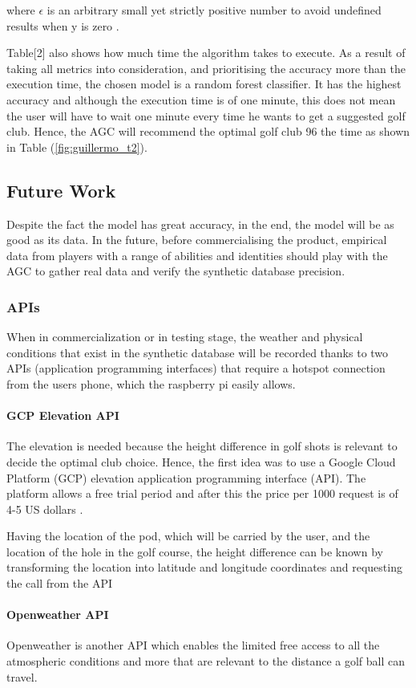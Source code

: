 \documentclass[11pt,landscape]{article}
\begin{document}
\begin{multicols}{3}
where $\epsilon$ is an arbitrary small yet strictly positive number to avoid
undefined results when y is zero
\cite{scikit}.

Table[2] also shows how much time the algorithm takes to execute. As a result of
taking all metrics into consideration, and prioritising the accuracy more than
the execution time, the chosen model is a random forest classifier. It has the
highest accuracy and although the execution time is of one minute, this does not
mean the user will have to wait one minute every time he wants to get a
suggested golf club. Hence, the AGC will recommend the optimal golf club 96%
the time as shown in Table (\ref{fig:guillermo_t2}).

\subsection{Future Work}
Despite the fact the model has great accuracy, in the end, the model will be as
good as its data. In the future, before commercialising the product, empirical
data from players with a range of abilities and identities should play with the
AGC to gather real data and verify the synthetic database precision.

\subsubsection{APIs}
When in commercialization or in testing stage, the weather and physical
conditions that exist in the synthetic database will be recorded thanks to two
APIs (application programming interfaces) that require a hotspot connection from
the users phone, which the raspberry pi easily allows.

\paragraph{GCP Elevation API} 
The elevation is needed because the height difference in golf shots is relevant
to decide the optimal club choice. Hence, the first idea was to use a Google
Cloud Platform (GCP) elevation application programming interface (API). The
platform allows a free trial period and after this the price per 1000 request is
of 4-5 US dollars \cite{google_docs}. 

Having the location of the pod, which will be carried by the user, and the
location of the hole in the golf course, the height difference can be known by
transforming the location into latitude and longitude coordinates and requesting
the call from the API

\paragraph{Openweather API}
Openweather is another API which enables the limited free access to all the
atmospheric conditions and more that are relevant to the distance a golf ball
can travel.

\end{multicols}
\end{document}
